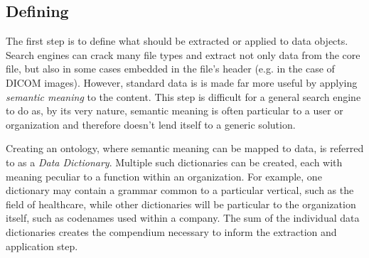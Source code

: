 \subsection{Defining} \label{s:def}
The first step is to define what \md{} should be extracted or applied to data objects. Search engines can crack many file types and extract not only data from the core file, but also in some cases \md{} embedded in the file's header (e.g. in the case of DICOM images). However, standard data is is made far more useful by applying \emph{semantic meaning} to the content. This step is difficult for a general search engine to do as, by its very nature, semantic meaning is often particular to a user or organization and therefore doesn't lend itself to a generic solution.

Creating an ontology, where semantic meaning can be mapped to data, is referred to as a \emph{Data Dictionary}. Multiple such dictionaries can be created, each with meaning peculiar to a function within an organization. For example, one dictionary may contain a grammar common to a particular vertical, such as the field of healthcare, while other dictionaries will be particular to the organization itself, such as codenames used within a company. The sum of the individual data dictionaries creates the compendium necessary to inform the extraction and application step.
